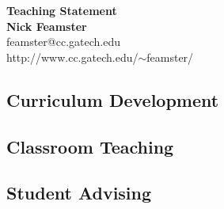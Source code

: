 \newpage \setcounter{page}{1}

\begin{center}

{\Large\textbf{Teaching Statement}}\\[.1in]
{\large\textbf{Nick Feamster}}\\[.05in]
feamster@cc.gatech.edu \\
http://www.cc.gatech.edu/$\sim$feamster/ \\[.1in]

\end{center}

\subsection*{Curriculum Development}

\subsection*{Classroom Teaching}



\subsection*{Student Advising}
